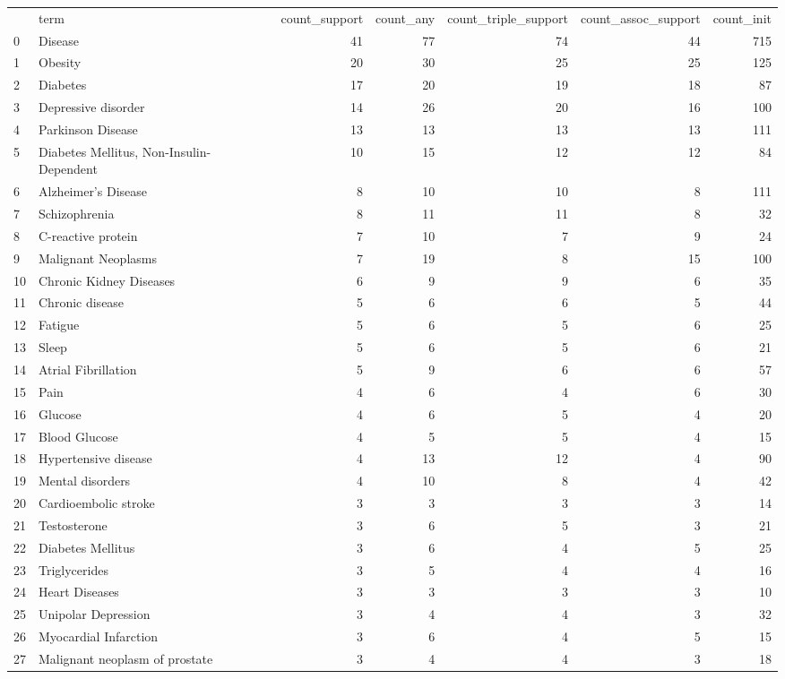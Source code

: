 \begin{tabular}{llrrrrr}
 & term & count_support & count_any & count_triple_support & count_assoc_support & count_init \\
0 & Disease & 41 & 77 & 74 & 44 & 715 \\
1 & Obesity & 20 & 30 & 25 & 25 & 125 \\
2 & Diabetes & 17 & 20 & 19 & 18 & 87 \\
3 & Depressive disorder & 14 & 26 & 20 & 16 & 100 \\
4 & Parkinson Disease & 13 & 13 & 13 & 13 & 111 \\
5 & Diabetes Mellitus, Non-Insulin-Dependent & 10 & 15 & 12 & 12 & 84 \\
6 & Alzheimer's Disease & 8 & 10 & 10 & 8 & 111 \\
7 & Schizophrenia & 8 & 11 & 11 & 8 & 32 \\
8 & C-reactive protein & 7 & 10 & 7 & 9 & 24 \\
9 & Malignant Neoplasms & 7 & 19 & 8 & 15 & 100 \\
10 & Chronic Kidney Diseases & 6 & 9 & 9 & 6 & 35 \\
11 & Chronic disease & 5 & 6 & 6 & 5 & 44 \\
12 & Fatigue & 5 & 6 & 5 & 6 & 25 \\
13 & Sleep & 5 & 6 & 5 & 6 & 21 \\
14 & Atrial Fibrillation & 5 & 9 & 6 & 6 & 57 \\
15 & Pain & 4 & 6 & 4 & 6 & 30 \\
16 & Glucose & 4 & 6 & 5 & 4 & 20 \\
17 & Blood Glucose & 4 & 5 & 5 & 4 & 15 \\
18 & Hypertensive disease & 4 & 13 & 12 & 4 & 90 \\
19 & Mental disorders & 4 & 10 & 8 & 4 & 42 \\
20 & Cardioembolic stroke & 3 & 3 & 3 & 3 & 14 \\
21 & Testosterone & 3 & 6 & 5 & 3 & 21 \\
22 & Diabetes Mellitus & 3 & 6 & 4 & 5 & 25 \\
23 & Triglycerides & 3 & 5 & 4 & 4 & 16 \\
24 & Heart Diseases & 3 & 3 & 3 & 3 & 10 \\
25 & Unipolar Depression & 3 & 4 & 4 & 3 & 32 \\
26 & Myocardial Infarction & 3 & 6 & 4 & 5 & 15 \\
27 & Malignant neoplasm of prostate & 3 & 4 & 4 & 3 & 18 \\

\end{tabular}
